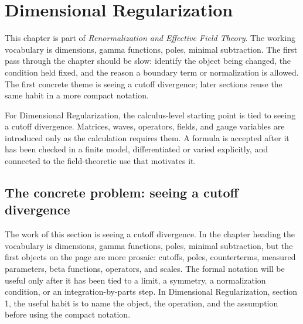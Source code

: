 \chapter{Dimensional Regularization}


This chapter is part of \emph{Renormalization and Effective Field Theory}.  The working vocabulary is dimensions, gamma functions, poles, minimal subtraction.  The first pass through the chapter should be slow: identify the object being changed, the condition held fixed, and the reason a boundary term or normalization is allowed.  The first concrete theme is seeing a cutoff divergence; later sections reuse the same habit in a more compact notation.

For Dimensional Regularization, the calculus-level starting point is tied to seeing a cutoff divergence.  Matrices, waves, operators, fields, and gauge variables are introduced only as the calculation requires them.  A formula is accepted after it has been checked in a finite model, differentiated or varied explicitly, and connected to the field-theoretic use that motivates it.

\section{The concrete problem: seeing a cutoff divergence}













The work of this section is seeing a cutoff divergence.  In the chapter heading the vocabulary is dimensions, gamma functions, poles, minimal subtraction, but the first objects on the page are more prosaic: cutoffs, poles, counterterms, measured parameters, beta functions, operators, and scales.  The formal notation will be useful only after it has been tied to a limit, a symmetry, a normalization condition, or an integration-by-parts step.  In Dimensional Regularization, section 1, the useful habit is to name the object, the operation, and the assumption before using the compact notation.

